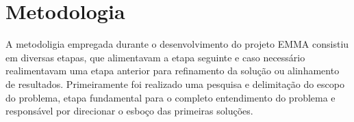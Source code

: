 \section{Metodologia}


A metodoligia empregada durante o desenvolvimento do projeto EMMA consistiu em
diversas etapas, que alimentavam a etapa seguinte e caso necessário
realimentavam uma etapa anterior para refinamento da solução ou alinhamento de
resultados. Primeiramente foi realizado uma pesquisa e delimitação do escopo do
problema, etapa fundamental para o completo entendimento do problema e
responsável por direcionar o esboço das primeiras soluções. 
